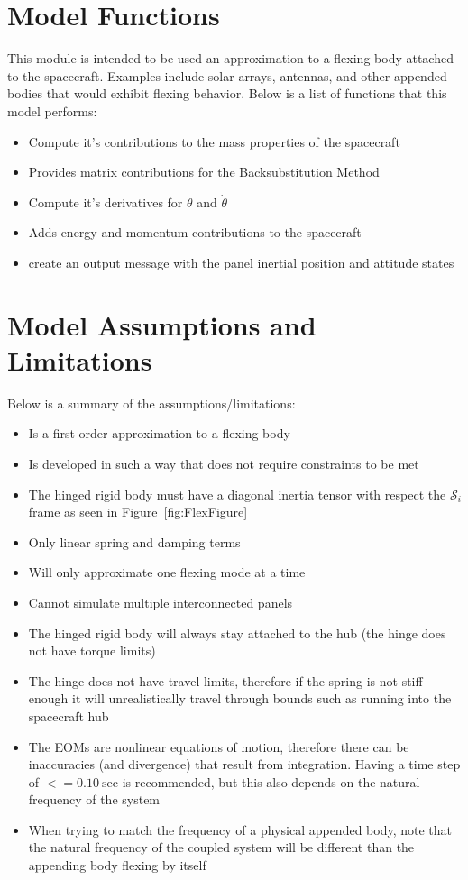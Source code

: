 \section{Model Functions}

This module is intended to be used an approximation to a flexing body attached to the spacecraft. Examples include solar arrays, antennas, and other appended bodies that would exhibit flexing behavior. Below is a list of functions that this model performs:

\begin{itemize}
	\item Compute it's contributions to the mass properties of the spacecraft
	\item Provides matrix contributions for the Backsubstitution Method
	\item Compute it's derivatives for $\theta$ and $\dot{\theta}$
	\item Adds energy and momentum contributions to the spacecraft
	\item create an output message with the panel inertial position and attitude states
\end{itemize}

\section{Model Assumptions and Limitations}
Below is a summary of the assumptions/limitations:

\begin{itemize}
	\item Is a first-order approximation to a flexing body
	\item Is developed in such a way that does not require constraints to be met
	\item The hinged rigid body must have a diagonal inertia tensor with respect the $\mathcal{S}_i$ frame as seen in Figure~\ref{fig:FlexFigure}
	\item Only linear spring and damping terms
	\item Will only approximate one flexing mode at a time
	\item Cannot simulate multiple interconnected panels
	\item The hinged rigid body will always stay attached to the hub (the hinge does not have torque limits)
	\item The hinge does not have travel limits, therefore if the spring is not stiff enough it will unrealistically travel through bounds such as running into the spacecraft hub
	\item The EOMs are nonlinear equations of motion, therefore there can be inaccuracies (and divergence) that result from integration. Having a time step of $<= 0.10\ \text{sec}$ is recommended, but this also depends on the natural frequency of the system
	\item When trying to match the frequency of a physical appended body, note that the natural frequency of the coupled system will be different than the appending body flexing by itself
\end{itemize}
